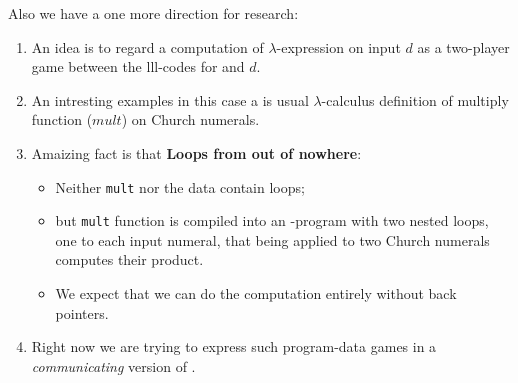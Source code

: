 \documentclass[a4paper, 10pt]{article} %
\newcommand{\bi}{\begin{itemize}}
\newcommand{\ei}{\end{itemize}}
\newcommand{\be}{\begin{enumerate}}
\newcommand{\ee}{\end{enumerate}}
\newcommand{\ii}{\item}
\newcommand{\red}[1]{{\color{red}#1}}
\newcommand{\green}[1]{{\color{blue!20!black!30!green}#1}}
\newcommand{\blue}[1]{{\color{blue}#1}}
\newcommand{\lam}[1]{{\color{brown}\textit{\boldmath{#1}}}}
\begin{document}
Also we have a one more direction for research:
\be
\ii An idea is to regard a \green{computation of $\lambda$-expression \lam{$M$} on input $d$} as a
  \red{ \blue{two-player game} between the {\sc lll}-codes for \lam{$M$} and $d$}.
\ii An intresting examples in this case a is usual $\lambda$-calculus definition of multiply function ($mult$)
  on Church numerals.
\ii Amaizing fact is that \textbf{Loops from out of nowhere}:
  \bi
  \ii \green{Neither {\tt mult} nor the data contain loops};
  \ii but  {\tt mult} function is compiled into \blue{an {\lam{LLL}}-program with two nested loops}, one to each input numeral,
    that being applied to two Church numerals computes their product.
  \ii We expect that we can do the computation \green{entirely without back pointers}.
  \ei
\ii Right now we are trying to express such program-data games in a \red{\em communicating}
  version of \lam{LLL}. 
\ee
\end{document}
